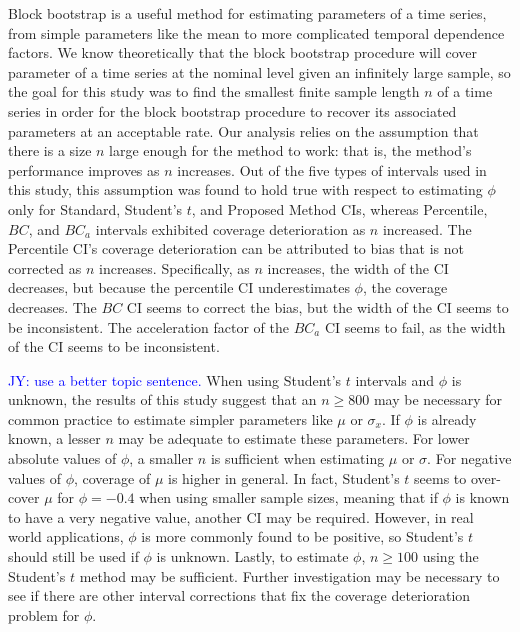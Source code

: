 \documentclass[12pt, letterpaper, titlepage]{article}
\newcommand{\jy}[1]{\textcolor{blue}{JY: #1}}
\begin{document}
Block bootstrap is a useful method for estimating parameters of a time series,
from simple parameters like the mean to more complicated temporal dependence
factors. We know theoretically that the block bootstrap procedure will cover
parameter of a time series at the nominal level given an infinitely large
sample, so the goal for this study was to find the smallest finite sample
length $n$ of a time series in order for the block bootstrap procedure to 
recover its associated parameters at an acceptable rate.
Our analysis relies on the assumption that there is a size $n$ large
enough for the method to work: that is, the method's performance improves as
$n$ increases. Out of the five types of intervals used in this study, this
assumption was found to hold true with respect to estimating $\phi$ only for
Standard, Student's $t$, and Proposed Method CIs, whereas Percentile, $BC$,
and $BC_a$ intervals exhibited coverage deterioration as $n$ increased. The
Percentile CI's coverage deterioration can be attributed to bias that is not
corrected as $n$ increases. Specifically, as $n$ increases, the width of the
CI decreases, but because the percentile CI underestimates $\phi$, the
coverage decreases. The $BC$ CI seems to correct the bias, but the width of
the CI seems to be inconsistent. The acceleration factor of the $BC_a$ CI
seems to fail, as the width of the CI seems to be inconsistent. 


\jy{use a better topic sentence.}
When using Student's $t$ intervals and $\phi$ is unknown, the results of this
study suggest that an $n \geq 800$ may be necessary for common practice to
estimate simpler parameters like $\mu$ or $\sigma_x$. If $\phi$ is already
known, a lesser $n$ may be adequate to estimate these parameters. For lower
absolute values of $\phi$, a smaller $n$ is sufficient when estimating $\mu$
or $\sigma$. For negative values of $\phi$, coverage of $\mu$ is higher in
general. In fact, Student's $t$ seems to over-cover $\mu$ for $\phi = - 0.4$
when using smaller sample sizes, meaning that if $\phi$ is known to have a
very negative value, another CI may be required. However, in real world
applications, $\phi$ is more commonly found to be positive, so Student's $t$
should still be used if $\phi$ is unknown. Lastly, to estimate $\phi$,
$n \geq 100$ using the Student's $t$ method may be sufficient. Further
investigation may be necessary to see if there are other interval corrections
that fix the coverage deterioration problem for $\phi$.
\end{document}
